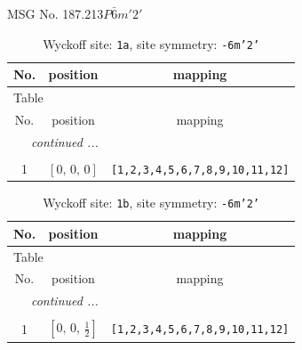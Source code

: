 \documentclass[fleqn,8pt]{jsarticle}
\begin{document}
\setcounter{MaxMatrixCols}{32}

\renewcommand{\tablename}{Table~}
\renewcommand{\figurename}{Figure~}
\begin{center}
\LARGE
MSG No. 187.213\quad$P\bar{6}m'2'$
\end{center}
\renewcommand{\arraystretch}{1.2}
\begin{longtable}{ccc}
\caption{Wyckoff site: {\tt 1a}, site symmetry: {\tt -6m'2'}}
 \\
 \hline \hline
No. & position & mapping \\ \hline \endfirsthead

\multicolumn{2}{l}{\tablename\ \thetable{}} \\
 \hline \hline
No. & position & mapping \\ \hline \endhead

 \hline \hline
\multicolumn{2}{r}{\footnotesize\it continued ...} \\ \endfoot

 \hline \hline
\multicolumn{2}{r}{} \\ \endlastfoot

1 & $\left[ 0,\, 0,\, 0 \right]$ & {\tt [1,2,3,4,5,6,7,8,9,10,11,12]} \\
\end{longtable}
\renewcommand{\arraystretch}{1.2}
\begin{longtable}{ccc}
\caption{Wyckoff site: {\tt 1b}, site symmetry: {\tt -6m'2'}}
 \\
 \hline \hline
No. & position & mapping \\ \hline \endfirsthead

\multicolumn{2}{l}{\tablename\ \thetable{}} \\
 \hline \hline
No. & position & mapping \\ \hline \endhead

 \hline \hline
\multicolumn{2}{r}{\footnotesize\it continued ...} \\ \endfoot

 \hline \hline
\multicolumn{2}{r}{} \\ \endlastfoot

1 & $\left[ 0,\, 0,\, \frac{1}{2} \right]$ & {\tt [1,2,3,4,5,6,7,8,9,10,11,12]} \\
\end{longtable}
\renewcommand{\arraystretch}{1.2}
\end{document}
